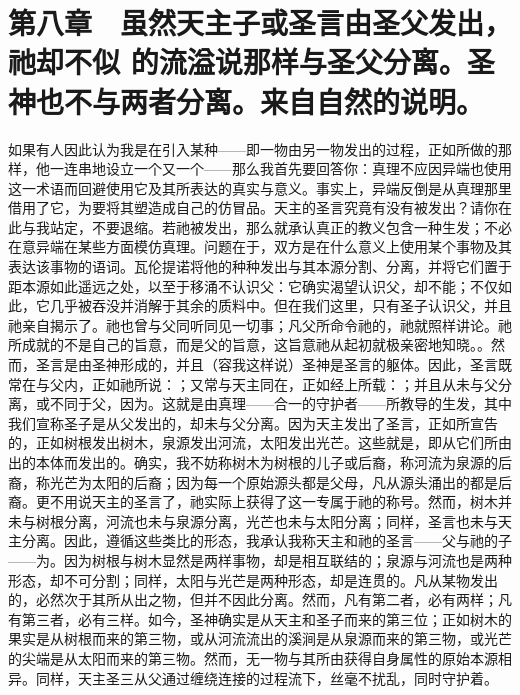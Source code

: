
\section{第八章　虽然天主子或圣言由圣父发出，祂却不似 的流溢说那样与圣父分离。圣神也不与两者分离。来自自然的说明。}

如果有人因此认为我是在引入某种——即一物由另一物发出的过程，正如所做的那样，他一连串地设立一个又一个——那么我首先要回答你：真理不应因异端也使用这一术语而回避使用它及其所表达的真实与意义。事实上，异端反倒是从真理那里借用了它，为要将其塑造成自己的仿冒品。天主的圣言究竟有没有被发出？请你在此与我站定，不要退缩。若祂被发出，那么就承认真正的教义包含一种生发；不必在意异端在某些方面模仿真理。问题在于，双方是在什么意义上使用某个事物及其表达该事物的语词。瓦伦提诺将他的种种发出与其本源分割、分离，并将它们置于距本源如此遥远之处，以至于移涌不认识父：它确实渴望认识父，却不能；不仅如此，它几乎被吞没并消解于其余的质料中。但在我们这里，只有圣子认识父，并且祂亲自揭示了。祂也曾与父同听同见一切事；凡父所命令祂的，祂就照样讲论。祂所成就的不是自己的旨意，而是父的旨意，这旨意祂从起初就极亲密地知晓。。然而，圣言是由圣神形成的，并且（容我这样说）圣神是圣言的躯体。因此，圣言既常在与父内，正如祂所说：；又常与天主同在，正如经上所载：；并且从未与父分离，或不同于父，因为。这就是由真理——合一的守护者——所教导的生发，其中我们宣称圣子是从父发出的，却未与父分离。因为天主发出了圣言，正如所宣告的，正如树根发出树木，泉源发出河流，太阳发出光芒。这些就是，即从它们所由出的本体而发出的。确实，我不妨称树木为树根的儿子或后裔，称河流为泉源的后裔，称光芒为太阳的后裔；因为每一个原始源头都是父母，凡从源头涌出的都是后裔。更不用说天主的圣言了，祂实际上获得了这一专属于祂的称号。然而，树木并未与树根分离，河流也未与泉源分离，光芒也未与太阳分离；同样，圣言也未与天主分离。因此，遵循这些类比的形态，我承认我称天主和祂的圣言——父与祂的子——为。因为树根与树木显然是两样事物，却是相互联结的；泉源与河流也是两种形态，却不可分割；同样，太阳与光芒是两种形态，却是连贯的。凡从某物发出的，必然次于其所从出之物，但并不因此分离。然而，凡有第二者，必有两样；凡有第三者，必有三样。如今，圣神确实是从天主和圣子而来的第三位；正如树木的果实是从树根而来的第三物，或从河流流出的溪涧是从泉源而来的第三物，或光芒的尖端是从太阳而来的第三物。然而，无一物与其所由获得自身属性的原始本源相异。同样，天主圣三从父通过缠绕连接的过程流下，丝毫不扰乱，同时守护着。\par

